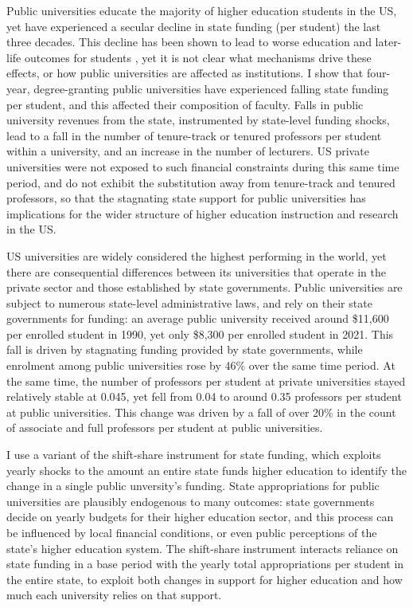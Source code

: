 \noindent
Public universities educate the majority of higher education students in the US, yet have experienced a secular decline in state funding (per student) the last three decades.
This decline has been shown to lead to worse education and later-life outcomes for students \citep{NBERw23736,NBERw27885}, yet it is not clear what mechanisms drive these effects, or how public universities are affected as institutions.
I show that four-year, degree-granting public universities have experienced falling state funding per student, and this affected their composition of faculty.
Falls in public university revenues from the state, instrumented by state-level funding shocks, lead to a fall in the number of tenure-track or tenured professors per student within a university, and an increase in the number of lecturers.
US private universities were not exposed to such financial constraints during this same time period, and do not exhibit the substitution away from tenure-track and tenured professors, so that the stagnating state support for public universities has implications for the wider structure of higher education instruction and research in the US.

US universities are widely considered the highest performing in the world, yet there are consequential differences between its universities that operate in the private sector and those established by state governments.
Public universities are subject to numerous state-level administrative laws, and rely on their state governments for funding: an average public university received around \$11,600 per enrolled student in 1990, yet only \$8,300 per enrolled student in 2021.
This fall is driven by stagnating funding provided by state governments, while enrolment among public universities rose by 46\% over the same time period.
At the same time, the number of professors per student at private universities stayed relatively stable at 0.045, yet fell from 0.04 to around 0.35 professors per student at public universities.
This change was driven by a fall of over 20\% in the count of associate and full professors per student at public universities.

I use a variant of the \cite{NBERw23736,NBERw27885} shift-share instrument for state funding, which exploits yearly shocks to the amount an entire state funds higher education to identify the change in a single public unversity's funding.
State appropriations for public universities are plausibly endogenous to many outcomes: state governments decide on yearly budgets for their higher education sector, and this process can be influenced by local financial conditions, or even public perceptions of the state's higher education system.
The shift-share instrument interacts reliance on state funding in a base period with the yearly total appropriations per student in the entire state, to exploit both changes in support for higher education and how much each university relies on that support.

